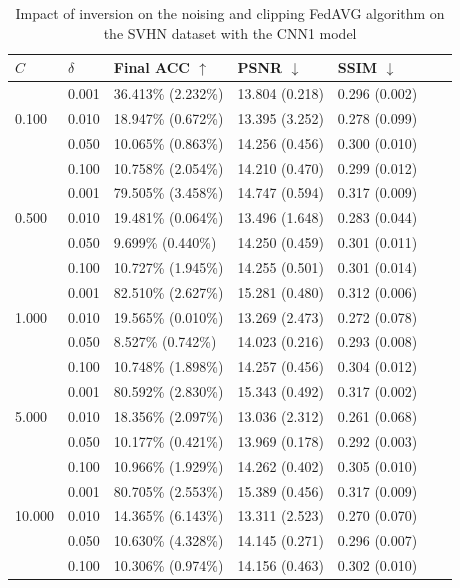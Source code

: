 \documentclass[conference,compsoc]{IEEEtran}
\begin{document}
\begin{table}[H]
\centering
\caption{Impact of inversion on the noising and clipping FedAVG algorithm on the SVHN dataset with the CNN1 model}
\label{table:dp_svhn_cnn1}
\begin{tabular}{lllllll}
\hline
$C$ & $\delta$ & \textbf{Final ACC} $\uparrow$ & \textbf{PSNR} $\downarrow$ & \textbf{SSIM} $\downarrow$ \\
\hline
\multirow{3}{*}{0.100} & 0.001 & 36.413\% (2.232\%) & 13.804 (0.218) & 0.296 (0.002) \\
& 0.010 & 18.947\% (0.672\%) & 13.395 (3.252) & 0.278 (0.099) \\
& 0.050 & 10.065\% (0.863\%) & 14.256 (0.456) & 0.300 (0.010) \\
& 0.100 & 10.758\% (2.054\%) & 14.210 (0.470) & 0.299 (0.012) \\
\hline
\multirow{3}{*}{0.500} & 0.001 & 79.505\% (3.458\%) & 14.747 (0.594) & 0.317 (0.009) \\
& 0.010 & 19.481\% (0.064\%) & 13.496 (1.648) & 0.283 (0.044) \\
& 0.050 & 9.699\% (0.440\%) & 14.250 (0.459) & 0.301 (0.011) \\
& 0.100 & 10.727\% (1.945\%) & 14.255 (0.501) & 0.301 (0.014) \\
\hline
\multirow{3}{*}{1.000} & 0.001 & 82.510\% (2.627\%) & 15.281 (0.480) & 0.312 (0.006) \\
& 0.010 & 19.565\% (0.010\%) & 13.269 (2.473) & 0.272 (0.078) \\
& 0.050 & 8.527\% (0.742\%) & 14.023 (0.216) & 0.293 (0.008) \\
& 0.100 & 10.748\% (1.898\%) & 14.257 (0.456) & 0.304 (0.012) \\
\hline
\multirow{3}{*}{5.000} & 0.001 & 80.592\% (2.830\%) & 15.343 (0.492) & 0.317 (0.002) \\
& 0.010 & 18.356\% (2.097\%) & 13.036 (2.312) & 0.261 (0.068) \\
& 0.050 & 10.177\% (0.421\%) & 13.969 (0.178) & 0.292 (0.003) \\
& 0.100 & 10.966\% (1.929\%) & 14.262 (0.402) & 0.305 (0.010) \\
\hline
\multirow{3}{*}{10.000} & 0.001 & 80.705\% (2.553\%) & 15.389 (0.456) & 0.317 (0.009) \\
& 0.010 & 14.365\% (6.143\%) & 13.311 (2.523) & 0.270 (0.070) \\
& 0.050 & 10.630\% (4.328\%) & 14.145 (0.271) & 0.296 (0.007) \\
& 0.100 & 10.306\% (0.974\%) & 14.156 (0.463) & 0.302 (0.010) \\
\hline
\end{tabular}
\end{table}
\end{document}
